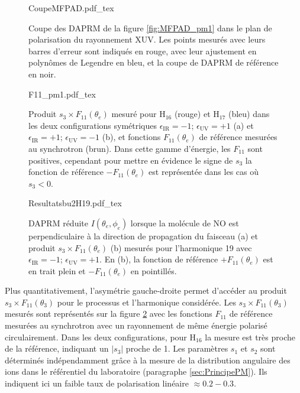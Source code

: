 \begin{figure}
\centering
\def\svgwidth{0.7\textwidth}
{CoupeMFPAD.pdf_tex}
\caption{Coupe des DAPRM de la figure \ref{fig:MFPAD_pm1} dans le plan de polarisation du rayonnement XUV. Les points mesurés avec leurs barres d'erreur sont indiqués en rouge, avec leur ajustement en polynômes de Legendre en bleu, et la coupe de DAPRM de référence en noir.}
\label{fig:CoupeMFPAD}
\end{figure}

\begin{figure}
\centering
\def\svgwidth{\textwidth}
{F11_pm1.pdf_tex}
\caption{Produit $s_3 \times F_{11}(\theta_e)$ mesuré pour H$_{16}$ (rouge) et H$_{17}$ (bleu) dans les deux configurations symétriques $\epsilon_{\text{IR}} = -1$; $\epsilon_{\text{UV}} = +1$ (a) et  $\epsilon_{\text{IR}} = +1$; $\epsilon_{\text{UV}} = -1$ (b), et fonctions $F_{11}(\theta_e)$ de référence mesurées au synchrotron (brun). Dans cette gamme d'énergie, les $F_{11}$ sont positives, cependant pour mettre en évidence le signe de $s_3$ la fonction de référence $-F_{11}(\theta_e)$ est représentée dans les cas où $s_3 <0$.}
\label{fig:F11_pm1}
\end{figure}

\begin{figure}
\centering
\def\svgwidth{\textwidth}
{Resultatsbu2H19.pdf_tex}
\caption{DAPRM réduite $I(\theta_e,\phi_e)$ lorsque la molécule de NO est perpendiculaire à la direction de propagation du faisceau (a) et produit $s_3 \times F_{11}(\theta_e)$ (b) mesurés pour l'harmonique 19 avec $\epsilon_{\text{IR}} = -1$; $\epsilon_{\text{UV}} = +1$. En (b), la fonction de référence $+F_{11}(\theta_e)$ est en trait plein et $-F_{11}(\theta_e)$ en pointillés.}
\label{fig:Resultatsbu2H19}
\end{figure}

Plus quantitativement, l'asymétrie gauche-droite permet d'accéder au produit $s_3 \times F_{11}(\theta_3)$ pour le processus et l'harmonique considérée. Les $s_3 \times F_{11}(\theta_3)$ mesurés sont représentés sur la figure \ref{fig:F11_pm1} avec les fonctions $F_{11}$ de référence mesurées au synchrotron avec un rayonnement de même énergie polarisé circulairement. Dans les deux configurations, pour H$_{16}$ la mesure est très proche de la référence, indiquant un $|s_3|$ proche de 1. Les paramètres $s_1$ et $s_2$ sont déterminés indépendamment grâce à la mesure de la distribution angulaire des ions dans le référentiel du laboratoire (paragraphe \ref{sec:PrincipePM}). Ils indiquent ici un faible taux de polarisation linéaire $\approx 0.2 -0.3$.

